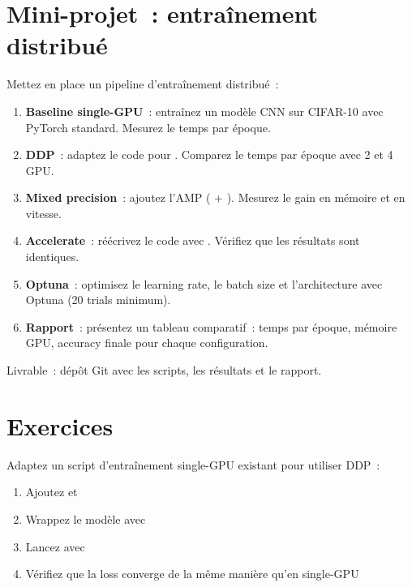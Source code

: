 \section{Mini-projet~: entra\^inement distribu\'e}
\label{sec:mini-project-ch6}

\begin{miniprojet}[title=\textbf{Mini-projet 6~: Entra\^inement multi-GPU}]
Mettez en place un pipeline d'entra\^inement distribu\'e~:
\begin{enumerate}
  \item \textbf{Baseline single-GPU}~: entra\^inez un mod\`ele CNN sur
    CIFAR-10 avec PyTorch standard. Mesurez le temps par \'epoque.
  \item \textbf{DDP}~: adaptez le code pour .
    Comparez le temps par \'epoque avec 2 et 4 GPU.
  \item \textbf{Mixed precision}~: ajoutez l'AMP ( +
    ). Mesurez le gain en m\'emoire et en vitesse.
  \item \textbf{Accelerate}~: r\'e\'ecrivez le code avec
    . V\'erifiez que les r\'esultats sont identiques.
  \item \textbf{Optuna}~: optimisez le learning rate, le batch size et
    l'architecture avec Optuna (20 trials minimum).
  \item \textbf{Rapport}~: pr\'esentez un tableau comparatif~: temps par
    \'epoque, m\'emoire GPU, accuracy finale pour chaque configuration.
\end{enumerate}
Livrable~: d\'ep\^ot Git avec les scripts, les r\'esultats et le rapport.
\end{miniprojet}

\section{Exercices}
\label{sec:exercises-ch6}

\begin{exercice}
Adaptez un script d'entra\^inement single-GPU existant pour utiliser DDP~:
\begin{enumerate}
  \item Ajoutez  et 
  \item Wrappez le mod\`ele avec 
  \item Lancez avec 
  \item V\'erifiez que la loss converge de la m\^eme mani\`ere qu'en
    single-GPU
\end{enumerate}
\end{exercice}

